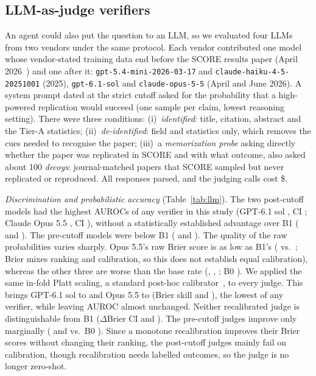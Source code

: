 \documentclass[conference]{IEEEtran}
\begin{document}



\subsection{LLM-as-judge verifiers}\label{sec:llm}
An agent could also put the question to an LLM, so we evaluated four LLMs from two vendors under the same protocol. Each vendor contributed one model whose vendor-stated training data end before the SCORE results paper (April 2026~\cite{tyner2026}) and one after it: \texttt{gpt-5.4-mini-2026-03-17} and \texttt{claude-haiku-4-5-20251001} (2025), \texttt{gpt-6.1-sol} and \texttt{claude-opus-5-5} (April and June 2026). A system prompt dated at the strict cutoff asked for the probability that a high-powered replication would succeed (one sample per claim, lowest reasoning setting). There were three conditions:
(i)~\emph{identified}: title, citation, abstract and the Tier-A statistics;
(ii)~\emph{de-identified}: field and statistics only, which removes the cues needed to recognise the paper;
(iii)~a \emph{memorization probe} asking directly whether the paper was replicated in SCORE and with what outcome, also asked about 100 \emph{decoys}: journal-matched papers that SCORE sampled but never replicated or reproduced.
All responses parsed, and the judging calls cost \$\llmCostTotal{}.

\emph{Discrimination and probabilistic accuracy} (Table~\ref{tab:llm}). The two post-cutoff models had the highest AUROCs of any verifier in this study (GPT-6.1 sol \llmSolIdAuc{}, CI \llmSolIdCi{}; Claude Opus 5.5 \llmOpusIdAuc{}, CI \llmOpusIdCi{}), without a statistically established advantage over B1 (\llmSolIdVsBone{} and \llmOpusIdVsBone{}). The pre-cutoff models were below B1 (\llmMiniIdAuc{} and \llmHaikuIdAuc{}). The quality of the raw probabilities varies sharply. Opus 5.5's raw Brier score is as low as B1's (\llmOpusIdBrier{} vs.\ \llmBoneBrier{}; Brier mixes ranking and calibration, so this does not establish equal calibration), whereas the other three are worse than the base rate (\llmSolIdBrier{}, \llmMiniIdBrier{}, \llmHaikuIdBrier{}; B0 \llmBzeroBrier{}). We applied the same in-fold Platt scaling, a standard post-hoc calibrator~\cite{guo2017,abbasli2026claimcal}, to every judge. This brings GPT-6.1 sol to \rcSolPlattBrier{} and Opus 5.5 to \rcOpusPlattBrier{} (Brier skill \rcSolPlattBss{} and \rcOpusPlattBss{}), the lowest of any verifier, while leaving AUROC almost unchanged. Neither recalibrated judge is distinguishable from B1 ($\Delta$Brier CI \rcSolPlattVsBoneCi{} and \rcOpusPlattVsBoneCi{}). The pre-cutoff judges improve only marginally (\rcHaikuPlattBrier{} and \rcMiniPlattBrier{} vs.\ B0 \llmBzeroBrier{}). Since a monotone recalibration improves their Brier scores without changing their ranking, the post-cutoff judges mainly fail on calibration, though recalibration needs labelled outcomes, so the judge is no longer zero-shot.
\end{document}
